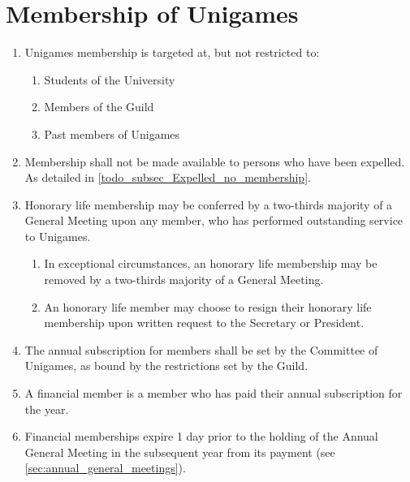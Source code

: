 \documentclass[a4paper]{article}
\begin{document}
\section{Membership of Unigames} \label{sec:membership}
\begin{enumerate}
    \item Unigames membership is targeted at, but not restricted to:
          \begin{enumerate}
              \item Students of the University
              \item Members of the Guild
              \item Past members of Unigames
          \end{enumerate}
    \item Membership shall not be made available to persons who have been expelled. As detailed in \cref{todo_subsec_Expelled_no_membership}.
    \item Honorary life membership may be conferred by a two-thirds majority of a General Meeting upon any member, who has performed outstanding service to Unigames.
          \begin{enumerate}
              \item In exceptional circumstances, an honorary life membership may be removed by a two-thirds majority of a General Meeting.
              \item An honorary life member may choose to resign their honorary life membership upon written request to the Secretary or President.
          \end{enumerate}
    \item The annual subscription for members shall be set by the Committee of Unigames, as bound by the restrictions set by the Guild.
    \item A financial member is a member who has paid their annual subscription for the year.
    \item Financial memberships expire 1 day prior to the holding of the Annual General Meeting in the subsequent year from its payment (see \cref{sec:annual_general_meetings}).
\end{enumerate}
\end{document}
